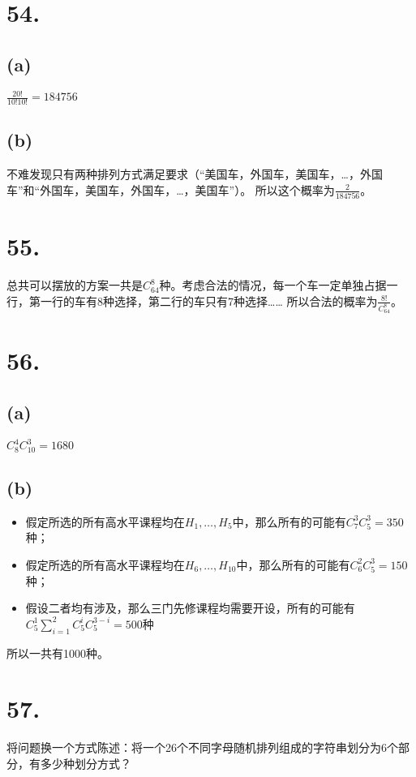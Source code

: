\documentclass[UTF8]{report}
\begin{document}
    \section*{54.}
        \subsection*{(a)}
            $\frac{20!}{10!10!} = 184756‬$
        \subsection*{(b)}
            不难发现只有两种排列方式满足要求（“美国车，外国车，美国车，\dots，外国车”和“外国车，美国车，外国车，\dots，美国车”）。
            所以这个概率为$\frac{2}{184756}$。
    \section*{55.}
        总共可以摆放的方案一共是$C_{64}^8$种。考虑合法的情况，每一个车一定单独占据一行，第一行的车有8种选择，第二行的车只有7种选择……
        所以合法的概率为$\frac{8!}{C_{64}^8}$。
    \section*{56.}
        \subsection*{(a)}
            $C_8^4C_{10}^3 = 1680$
        \subsection*{(b)}
            \begin{itemize}
                \item 假定所选的所有高水平课程均在$H_1, \dots, H_5$中，那么所有的可能有$C_7^3C_5^3 = 350$种；
                \item 假定所选的所有高水平课程均在$H_6, \dots, H_10$中，那么所有的可能有$C_6^2C_5^3 = 150$种；
                \item 假设二者均有涉及，那么三门先修课程均需要开设，所有的可能有$C_5^1\sum_{i = 1}^2C_5^iC_5^{3 - i} = 500$种
            \end{itemize}

            所以一共有1000种。
    \section*{57.}
        将问题换一个方式陈述：将一个26个不同字母随机排列组成的字符串划分为6个部分，有多少种划分方式？
        
\end{document}
